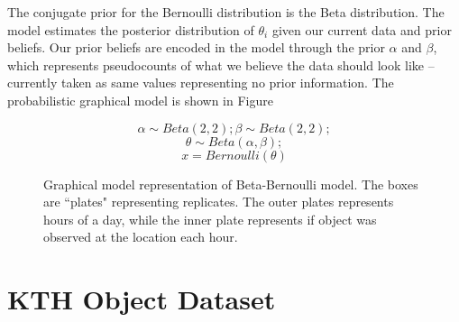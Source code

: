 The conjugate prior for the Bernoulli distribution is the Beta distribution. The model estimates the posterior distribution of $\theta_i$ given our current data and prior beliefs. Our prior beliefs are encoded in the model through the prior $\alpha$ and $\beta$, which represents pseudocounts of what we believe the data should look like – currently taken as same values representing no prior information. The probabilistic graphical model is shown in Figure \cite{bbm}

\noindent
\begin{figure}[htp]

\begin{minipage}{0.3\textwidth}
\centering


\end{minipage}%
\begin{minipage}{0.7\textwidth}

\begin{equation*}
	\alpha \sim Beta(2,2) ; \beta \sim Beta(2, 2);
\end{equation*}
\begin{equation*}
	\theta \sim Beta(\alpha, \beta);
\end{equation*}
\begin{equation*}
	x = Bernoulli(\theta)
\end{equation*}
\end{minipage}
\caption[Beta-Bernoulli graphical model]{Graphical model representation of Beta-Bernoulli model. The boxes are ``plates" representing replicates. The outer plates represents hours of a day, while the inner plate represents if object was observed at the location each hour.}
\label{bbm}
\end{figure}


\section{KTH Object Dataset}

